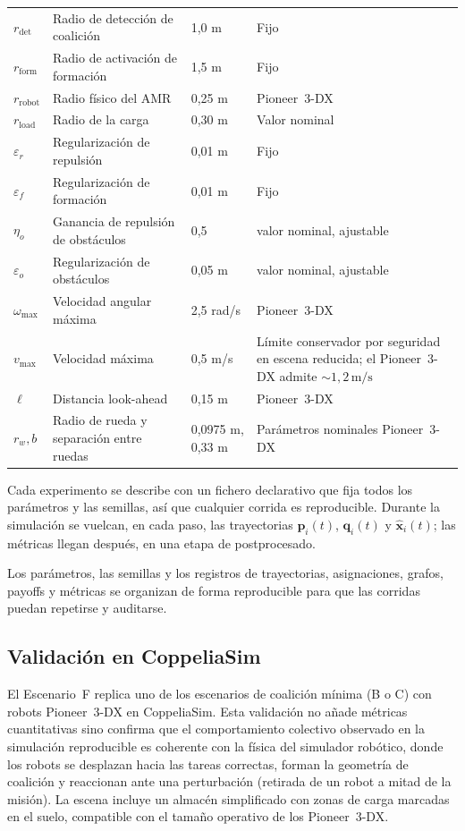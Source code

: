 \begin{table}[htbp]
\begin{tabularx}{\textwidth}{>{\ttfamily}p{}p{}p{}Y}
$r_{\mathrm{det}}$ & Radio de detección de coalición & 1{,}0 m & Fijo \\
$r_{\mathrm{form}}$ & Radio de activación de formación & 1{,}5 m & Fijo \\
$r_{\mathrm{robot}}$ & Radio físico del AMR & 0{,}25 m & Pioneer~3-DX \\
$r_{\mathrm{load}}$ & Radio de la carga & 0{,}30 m & Valor nominal \\
$\varepsilon_r$ & Regularización de repulsión & 0{,}01 m & Fijo \\
$\varepsilon_f$ & Regularización de formación & 0{,}01 m & Fijo \\
$\eta_o$ & Ganancia de repulsión de obstáculos & 0{,}5 & valor nominal, ajustable \\
$\varepsilon_o$ & Regularización de obstáculos & 0{,}05 m & valor nominal, ajustable \\
$\omega_{\max}$ & Velocidad angular máxima & 2{,}5 rad/s & Pioneer~3-DX \\
$v_{\max}$ & Velocidad máxima & 0{,}5 m/s & Límite conservador por seguridad en escena reducida; el Pioneer~3-DX admite ${\sim}1{,}2\,\text{m/s}$ \\
$\ell$ & Distancia look-ahead & 0{,}15 m & Pioneer~3-DX \\
$r_w,b$ & Radio de rueda y separación entre ruedas & 0{,}0975 m, 0{,}33 m & Parámetros nominales Pioneer~3-DX \\
\bottomrule
\end{tabularx}
\end{table}

Cada experimento se describe con un fichero declarativo que fija todos los parámetros
y las semillas, así que cualquier corrida es reproducible. Durante la simulación se
vuelcan, en cada paso, las trayectorias $\mathbf{p}_i(t)$, $\mathbf{q}_i(t)$ y
$\hat{\mathbf{x}}_i(t)$; las métricas llegan después, en una etapa de postprocesado.

Los parámetros, las semillas y los registros de trayectorias, asignaciones, grafos,
payoffs y métricas se organizan de forma reproducible para que las corridas puedan
repetirse y auditarse.

\subsection{Validación en CoppeliaSim}

El Escenario~F replica uno de los escenarios de coalición mínima (B o C) con
robots Pioneer~3-DX en CoppeliaSim. Esta validación no añade métricas cuantitativas sino
confirma que el comportamiento colectivo observado en la simulación reproducible es coherente con la
física del simulador robótico, donde los robots se desplazan hacia las tareas correctas,
forman la geometría de coalición y reaccionan ante una perturbación (retirada de un
robot a mitad de la misión). La escena incluye un almacén simplificado con zonas de
carga marcadas en el suelo, compatible con el tamaño operativo de los Pioneer~3-DX.

